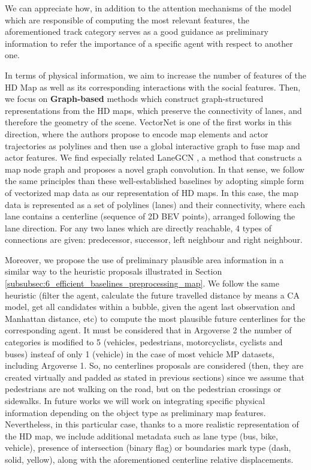 We can appreciate how, in addition to the attention mechanisms of the model which are responsible of computing the most relevant features, the aforementioned track category serves as a good guidance as preliminary information to refer the importance of a specific agent with respect to another one.

In terms of physical information, we aim to increase the number of features of the HD Map as well as its corresponding interactions with the social features. Then, we focus on \textbf{Graph-based} methods \cite{zeng2021lanercnn} which construct graph-structured representations from the HD maps, which preserve the connectivity of lanes, and therefore the geometry of the scene. VectorNet \cite{gao2020vectornet} is one of the first works in this direction, where the authors propose to encode map elements and actor trajectories as polylines and then use a global interactive graph to fuse map and actor features. We find especially related LaneGCN \cite{liang2020learning}, a method that constructs a map node graph and proposes a novel graph convolution. In that sense, we follow the same principles than these well-established baselines by adopting simple form of vectorized map data as our representation of HD maps. In this case, the map data is represented as a set of polylines (lanes) and
their connectivity, where each lane contains a centerline (sequence of 2D \ac{BEV} points), arranged following the lane direction. For any two lanes which are directly reachable, 4 types of connections are given: predecessor, successor, left neighbour and right neighbour.

Moreover, we propose the use of preliminary plausible area information in a similar way to the heuristic proposals illustrated in Section \ref{subsubsec:6_efficient_baselines_preprocessing_map}. We follow the same heuristic (filter the agent, calculate the future travelled distance by means a CA model, get all candidates within a bubble, given the agent last observation and Manhattan distance, etc) to compute the most plausible future centerlines for the corresponding agent. It must be considered that in Argoverse 2 the number of categories is modified to 5 (vehicles, pedestrians, motorcyclists, cyclists and buses) insteaf of only 1 (vehicle) in the case of most vehicle \ac{MP} datasets, including Argoverse 1. So, no centerlines proposals are considered (then, they are created virtually and padded as stated in previous sections) since we assume that pedestrians are not walking on the road, but on the pedestrian crossings or sidewalks. In future works we will work on integrating specific physical information depending on the object type as preliminary map features. Nevertheless, in this particular case, thanks to a more realistic representation of the HD map, we include additional metadata such as lane type (bus, bike, vehicle), presence of intersection (binary flag) or boundaries mark type (dash, solid, yellow), along with the aforementioned centerline relative displacements. 

